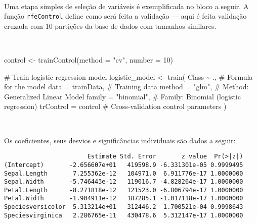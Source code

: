 \documentclass[
  a4paperpaper,
]{article}
\newenvironment{Shaded}{\begin{snugshade}}{\end{snugshade}}
\newcommand{\AttributeTok}[1]{\textcolor[rgb]{0.40,0.45,0.13}{#1}}
\newcommand{\CommentTok}[1]{\textcolor[rgb]{0.37,0.37,0.37}{#1}}
\newcommand{\DecValTok}[1]{\textcolor[rgb]{0.68,0.00,0.00}{#1}}
\newcommand{\FunctionTok}[1]{\textcolor[rgb]{0.28,0.35,0.67}{#1}}
\newcommand{\NormalTok}[1]{\textcolor[rgb]{0.00,0.23,0.31}{#1}}
\newcommand{\OtherTok}[1]{\textcolor[rgb]{0.00,0.23,0.31}{#1}}
\newcommand{\SpecialCharTok}[1]{\textcolor[rgb]{0.37,0.37,0.37}{#1}}
\newcommand{\StringTok}[1]{\textcolor[rgb]{0.13,0.47,0.30}{#1}}
\begin{document}
~

Uma etapa simples de seleção de variáveis é exemplificada no bloco a
seguir. A função \texttt{rfeControl} define como será feita a validação
--- aqui é feita validação cruzada com 10 partições da base de dados com
tamanhos similares.

~

\begin{Shaded}
\begin{Highlighting}[]
\NormalTok{control }\OtherTok{\textless{}{-}} \FunctionTok{trainControl}\NormalTok{(}\AttributeTok{method =} \StringTok{"cv"}\NormalTok{, }\AttributeTok{number =} \DecValTok{10}\NormalTok{)}

\CommentTok{\# Train logistic regression model}
\NormalTok{logistic\_model }\OtherTok{\textless{}{-}} \FunctionTok{train}\NormalTok{(}
\NormalTok{  Class }\SpecialCharTok{\textasciitilde{}}\NormalTok{ .,                            }\CommentTok{\# Formula for the model}
  \AttributeTok{data =}\NormalTok{ trainData,                     }\CommentTok{\# Training data}
  \AttributeTok{method =} \StringTok{"glm"}\NormalTok{,                       }\CommentTok{\# Method: Generalized Linear Model}
  \AttributeTok{family =} \StringTok{"binomial"}\NormalTok{,                  }\CommentTok{\# Family: Binomial (logistic regression)}
  \AttributeTok{trControl =}\NormalTok{ control                   }\CommentTok{\# Cross{-}validation control parameters}
\NormalTok{)}
\end{Highlighting}
\end{Shaded}

~

Os coeficientes, seus desvios e significâncias individuais são dados a
seguir:

\begin{Shaded}
\end{Shaded}

\begin{verbatim}
                       Estimate Std. Error       z value  Pr(>|z|)
(Intercept)       -2.656607e+01   419598.9 -6.331301e-05 0.9999495
Sepal.Length       7.255362e-12   104971.0  6.911776e-17 1.0000000
Sepal.Width       -5.746443e-12   119016.7 -4.828264e-17 1.0000000
Petal.Length      -8.271818e-12   121523.0 -6.806794e-17 1.0000000
Petal.Width       -1.904911e-12   187285.1 -1.017118e-17 1.0000000
Speciesversicolor  5.313214e+01   312446.2  1.700521e-04 0.9998643
Speciesvirginica   2.286765e-11   430478.6  5.312147e-17 1.0000000
\end{verbatim}
\end{document}
